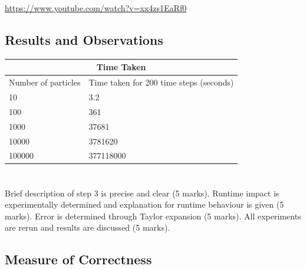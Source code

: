 \documentclass[paper=a4, fontsize=11pt]{scrartcl}
\numberwithin{equation}{section}		%
\numberwithin{figure}{section}			%
\numberwithin{table}{section}				%
\begin{document}
\url{https://www.youtube.com/watch?v=xx4zs1EaRf0}

\subsection{Results and Observations}

\centering
\begin{tabular}{ |p{7.5cm}||p{7.5cm}|  }
 \hline
 \multicolumn{2}{|c|}{Time Taken} \\
 \hline
 Number of particles & Time taken for 200 time steps (seconds)\\
 \hline
 10 & 3.2 \\
 100 & 361 \\
 1000 & 37681 \\
 10000 & 3781620 \\
 100000 & 377118000 \\
 \hline
\end{tabular}

\section{}

Brief description of step 3 is precise
and clear (5 marks). Runtime impact is
experimentally determined and
explanation for runtime behaviour is
given (5 marks). Error is determined
through Taylor expansion (5 marks). All
experiments are rerun and results are
discussed (5 marks).

\subsection{Measure of Correctness}
\end{document}
